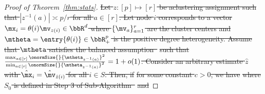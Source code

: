\documentclass[lettersize,onecolumn,journal]{IEEEtran}
\theoremstyle{definition}
\newtheorem{lem}{Lemma}
\theoremstyle{definition}
\providecommand{\DIFdeltex}[1]{{\protect\color{red}\sout{#1}}}                      %
\providecommand{\DIFdel}[1]{\texorpdfstring{\DIFdeltex{#1}}{}} %
\begin{document}
\begin{proof}[Proof of Theorem~\ref{thm:stats}]
\DIFdel{Let $z: [p] \mapsto [r]$ be aclustering assignment such that $|z^{-1}(a)| \asymp p/r$ for all $a \in [r]$. Let node $i$ corresponds to a vector $\mx_i  = \theta(i) \mv_{z(i)} \in \bbR^d$ where $\{\mv_a\}_{a = 1}^r$ are the cluster centers and $\mtheta = \entry{\theta(i)} \in \bbR^p_+$ is the positive degree heterogeneity. Assume that  $\mtheta$ satisfies the balanced assumption~}%
\DIFdel{such that ${\max_{a \in [r]} \onormSize{}{\mtheta_{z^{-1}(a)}}^2 \over \min_{a \in [r]} \onormSize{}{\mtheta_{z^{-1}(a)}}^2 }= 1 + o(1)$. Consider an arbitrary estimate $\hat z$ with $\hat \mx_i = \hat \mv_{\hat z(i)}$ for all $ i \in S$. Then, if
}%
\DIFdel{for some constant $c >0$, we have 
}%
\DIFdel{where $S_0$ is defined in Step 3 of Sub-Algorithm~}%
\DIFdel{and
}%




\end{proof}
\end{document}
